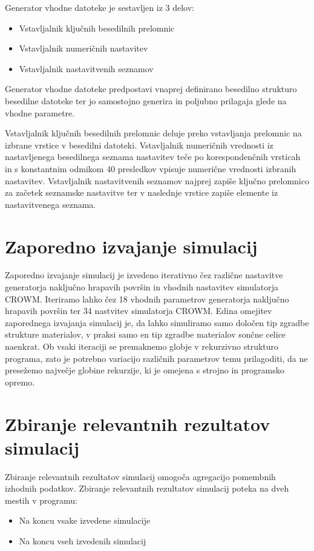 \documentclass[a4paper,twoside,openright,12pt,slovene]{book}
\begin{document}
\noindent Generator vhodne datoteke je sestavljen iz 3 delov:

\begin{itemize}
    \setlength\itemsep{0.1em}
    \item Vstavljalnik ključnih besedilnih prelomnic
    \item Vstavljalnik numeričnih nastavitev
    \item Vstavljalnik nastavitvenih seznamov
\end{itemize}

Generator vhodne datoteke predpostavi vnaprej definirano besedilno strukturo besedilne datoteke ter jo samostojno generira in poljubno prilagaja glede na vhodne parametre.

Vstavljalnik ključnih besedilnih prelomnic deluje preko vstavljanja prelomnic na izbrane vrstice v besedilni datoteki. Vstavljalnik numeričnih vrednosti iz nastavljenega besedilnega seznama nastavitev teče po korespondenčnih vrsticah in s konstantnim odmikom 40 presledkov vpisuje numerične vrednosti izbranih nastavitev. Vstavljalnik nastavitvenih seznamov najprej zapiše ključno prelomnico za začetek seznamske nastavitve ter v naslednje vrstice zapiše elemente iz nastavitvenega seznama.


\section{Zaporedno izvajanje simulacij}
\label{zaporednoIzvajanje}

Zaporedno izvajanje simulacij je izvedeno iterativno čez različne nastavitve generatorja naključno hrapavih površin in vhodnih nastavitev simulatorja CROWM. Iteriramo lahko čez 18 vhodnih parametrov generatorja naključno hrapavih površin ter 34 nastvitev simulatorja CROWM. Edina omejitev zaporednega izvajanja simulacij je, da lahko simuliramo samo določen tip zgradbe strukture materialov, v praksi samo en tip zgradbe materialov sončne celice naenkrat. Ob vsaki iteraciji se premaknemo globje v rekurzivno strukturo programa, zato je potrebno variacijo različnih parametrov temu prilagoditi, da ne presežemo največje globine rekurzije, ki je omejena s strojno in programsko opremo. 


\section{Zbiranje relevantnih rezultatov simulacij}
\label{zbiranjeRezultatov}

Zbiranje relevantnih rezultatov simulacij omogoča agregacijo pomembnih izhodnih podatkov. Zbiranje relevantnih rezultatov simulacij poteka na dveh mestih v programu:
\begin{itemize}
    \setlength\itemsep{0.1em}
    \item Na koncu vsake izvedene simulacije
    \item Na koncu vseh izvedenih simulacij
\end{itemize}
\end{document}
